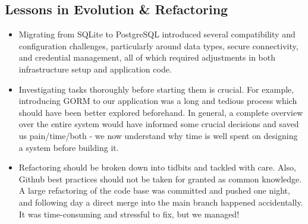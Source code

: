 
\subsection{Lessons in Evolution \& Refactoring}
\begin{itemize} 
    \item Migrating from SQLite to PostgreSQL introduced several compatibility and configuration challenges, particularly around data types, secure connectivity, and credential management, all of which required adjustments in both infrastructure setup and application code.
    \item Investigating tasks thoroughly before starting them is crucial. For example, introducing GORM to our application was a long and tedious process which should have been better explored beforehand. In general, a complete overview over the entire system would have informed some crucial decisions and saved us pain/time/both - we now understand why time is well spent on designing a system before building it.
    \item Refactoring should be broken down into tidbits and tackled with care. Also, Github best practices should not be taken for granted as common knowledge. A large refactoring of the code base was committed and pushed one night, and following day a direct merge into the main branch happened accidentally. It was time-consuming and stressful to fix, but we managed!  
\end{itemize}

